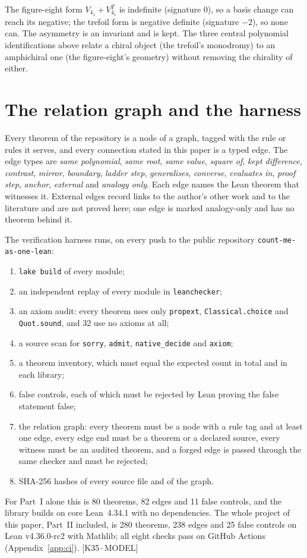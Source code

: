 \documentclass[11pt]{article}
\theoremstyle{definition}
\newcommand{\lean}[1]{\texttt{\small #1}}
\newcommand{\dtag}[1]{#1}
\begin{document}
The figure-eight form $V_{4_1}+V_{4_1}^T$ is indefinite (signature $0$), so a basis change can reach its negative; the trefoil form is negative definite (signature $-2$), so none can. The asymmetry is an invariant and is kept. The three central polynomial identifications above relate a chiral object (the trefoil's monodromy) to an amphichiral one (the figure-eight's geometry) without removing the chirality of either.

\section{The relation graph and the harness}
Every theorem of the repository is a node of a graph, tagged with the rule or rules it serves, and every connection stated in this paper is a typed edge. The edge types are \emph{same polynomial}, \emph{same root}, \emph{same value}, \emph{square of}, \emph{kept difference}, \emph{contrast}, \emph{mirror}, \emph{boundary}, \emph{ladder step}, \emph{generalises}, \emph{converse}, \emph{evaluates in}, \emph{proof step}, \emph{anchor}, \emph{external} and \emph{analogy only}. Each edge names the Lean theorem that witnesses it. External edges record links to the author's other work and to the literature and are not proved here; one edge is marked analogy-only and has no theorem behind it.

The verification harness runs, on every push to the public repository \texttt{count-me-as-one-lean}:
\begin{enumerate}[leftmargin=2em]
\item \lean{lake build} of every module;
\item an independent replay of every module in \lean{leanchecker};
\item an axiom audit: every theorem uses only \lean{propext}, \lean{Classical.choice} and \lean{Quot.sound}, and 32 use no axioms at all;
\item a source scan for \lean{sorry}, \lean{admit}, \lean{native\_decide} and \lean{axiom};
\item a theorem inventory, which must equal the expected count in total and in each library;
\item false controls, each of which must be rejected by Lean proving the false statement false;
\item the relation graph: every theorem must be a node with a rule tag and at least one edge, every edge end must be a theorem or a declared source, every witness must be an audited theorem, and a forged edge is passed through the same checker and must be rejected;
\item SHA-256 hashes of every source file and of the graph.
\end{enumerate}
For Part~I alone this is 80 theorems, 82 edges and 11 false controls, and the library builds on core Lean~4.34.1 with no dependencies. The whole project of this paper, Part~II included, is 280 theorems, 238 edges and 25 false controls on Lean v4.36.0-rc2 with Mathlib; all eight checks pass on GitHub Actions (Appendix~\ref{app:ci}).\dtag{ \textsf{\small[K35\,$\cdot$\,MODEL]}}
\end{document}
